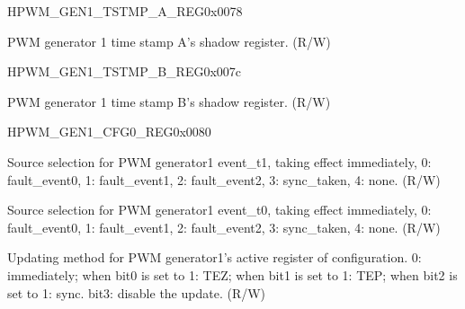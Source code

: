 \begin{register}{H}{PWM\_GEN1\_TSTMP\_A\_REG}{0x0078}\label{regdesc:PWMGEN1TSTMPAREG}
%
%
\regnewline%
\begin{regdesc}\begin{reglist}
\item [PWM\_GEN1\_A]PWM generator 1 time stamp A's shadow register. (R/W)
\end{reglist}\end{regdesc}
\end{register}


\begin{register}{H}{PWM\_GEN1\_TSTMP\_B\_REG}{0x007c}\label{regdesc:PWMGEN1TSTMPBREG}
%
%
\regnewline%
\begin{regdesc}\begin{reglist}
\item [PWM\_GEN1\_B]PWM generator 1 time stamp B's shadow register. (R/W)
\end{reglist}\end{regdesc}
\end{register}


\begin{register}{H}{PWM\_GEN1\_CFG0\_REG}{0x0080}\label{regdesc:PWMGEN1CFG0REG}
%
%
%
%
\regnewline%
\begin{regdesc}\begin{reglist}
\item [PWM\_GEN1\_T1\_SEL]Source selection for PWM generator1 event\_t1, taking effect immediately, 0: fault\_event0, 1: fault\_event1, 2: fault\_event2, 3: sync\_taken, 4: none. (R/W)
\item [PWM\_GEN1\_T0\_SEL]Source selection for PWM generator1 event\_t0, taking effect immediately, 0: fault\_event0, 1: fault\_event1, 2: fault\_event2, 3: sync\_taken, 4: none. (R/W)
\item [PWM\_GEN1\_CFG\_UPMETHOD]Updating method for PWM generator1's active register of configuration. 0: immediately; when bit0 is set to 1: TEZ; when bit1 is set to 1: TEP; when bit2 is set to 1: sync. bit3: disable the update. (R/W)
\end{reglist}\end{regdesc}
\end{register}



